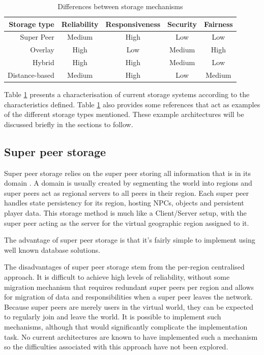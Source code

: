 \documentclass[10pt,a4paper,conference]{IEEEtran}
\begin{document}
\begin{table}[htbp]
\centering
\begin{tabular}{|r|c|c|c|c|}
\hline
Storage type & Reliability & Responsiveness & Security & Fairness\\
\hline
Super Peer & Medium & High & Low & Low\\
Overlay & High & Low & Medium & High\\
Hybrid & High & High & Medium & Low\\
Distance-based & Medium & High & Low & Medium\\
\hline
\end{tabular}
\caption{Differences between storage mechanisms} \label{tab_storage}
\end{table}
%
Table \ref{tab_storage} presents a characterisation of current storage systems according to the characteristics defined. Table \ref{tab_storage} also
provides some references that act as examples of the different storage types mentioned. These example architectures will be discussed briefly in the
sections to follow.

\subsection{Super peer storage}

Super peer storage relies on the super peer storing all information that is in its domain \cite{knutsson_p2p_first}. A domain is usually created by
segmenting the world into regions and super peers act as regional servers to all peers in their region. Each super peer handles state persistency for
its region, hosting NPCs, objects and persistent player data. This storage method is much like a Client/Server setup, with the super peer acting as
the server for the virtual geographic region assigned to it.

The advantage of super peer storage is that it's fairly simple to implement using well known database solutions.

The disadvantages of super peer storage stem from the per-region centralised approach. It is difficult to achieve high levels of reliability, without
some migration mechanism that requires redundant super peers per region and allows for migration of data and responsibilities when a super peer
leaves the network. Because super peers are merely users in the virtual world, they can be expected to regularly join and leave the world. It is
possible to implement such mechanisms, although that would significantly complicate the implementation task. No current architectures are known to
have implemented such a mechanism so the difficulties associated with this approach have not been explored.
\end{document}
